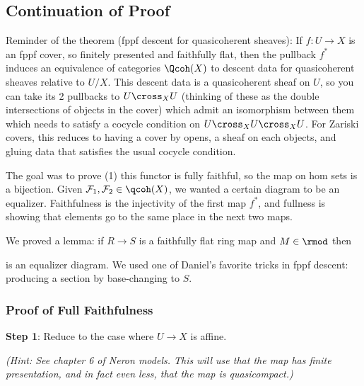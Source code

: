 \hypertarget{continuation-of-proof}{%
\subsection{Continuation of Proof}\label{continuation-of-proof}}

Reminder of the theorem (fppf descent for quasicoherent sheaves): If
\(f:U\to X\) is an fppf cover, so finitely presented and faithfully
flat, then the pullback \(f^*\) induces an equivalence of categories
\(\Qcoh(X)\) to descent data for quasicoherent sheaves relative to
\(U/X\). This descent data is a quasicoherent sheaf on \(U\), so you can
take its 2 pullbacks to \(U\cross_X U\) (thinking of these as the double
intersections of objects in the cover) which admit an isomorphism
between them which needs to satisfy a cocycle condition on
\(U\cross_X U \cross_X U\). For Zariski covers, this reduces to having a
cover by opens, a sheaf on each objects, and gluing data that satisfies
the usual cocycle condition.

The goal was to prove (1) this functor is fully faithful, so the map on
hom sets is a bijection. Given
\(\mathcal{F}_1, \mathcal{F}_2 \in \qcoh(X)\), we wanted a certain
diagram to be an equalizer. Faithfulness is the injectivity of the first
map \(f^*\), and fullness is showing that elements go to the same place
in the next two maps.

We proved a lemma: if \(R\to S\) is a faithfully flat ring map and
\(M\in \rmod\) then

\begin{center}
\end{center}

is an equalizer diagram. We used one of Daniel's favorite tricks in fppf
descent: producing a section by base-changing to \(S\).

\hypertarget{proof-of-full-faithfulness}{%
\subsubsection{Proof of Full
Faithfulness}\label{proof-of-full-faithfulness}}

\begin{exercise}

\textbf{Step 1}: Reduce to the case where \(U\to X\) is affine.

\emph{(Hint: See chapter 6 of Neron models. This will use that the map
has finite presentation, and in fact even less, that the map is
quasicompact.)}

\end{exercise}

